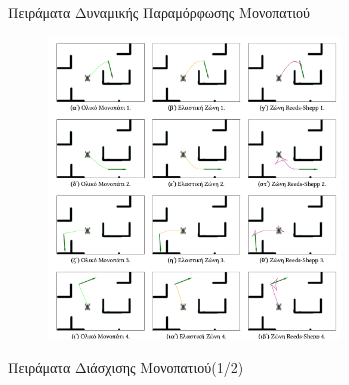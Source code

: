 \documentclass[10pt, compress, handout]{beamer} %
\begin{document}
\begin{frame}{Πειράματα Δυναμικής Παραμόρφωσης Μονοπατιού}
	\begin{figure}
		\includegraphics[height=8cm]{Figures/rsband_exp.png}	
	\end{figure}		
\end{frame}

\begin{frame}{Πειράματα Διάσχισης Μονοπατιού(1/2)}
	\begin{figure}
	\end{figure}		
\end{frame}
\end{document}
